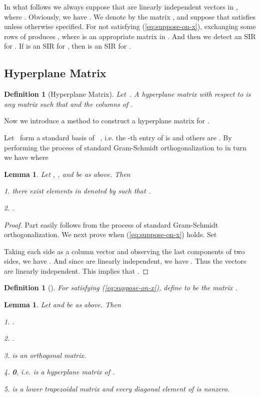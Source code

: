 \documentclass{sig-alternate}
\newtheorem{lem}[theorem]{Lemma}
\newtheorem{defn}[theorem]{Definition}
\numberwithin{theorem}{section} \numberwithin{equation}{section}
\begin{document}
In what follows we always suppose that  are linearly independent vectors in ,
where . Obviously, we
have . We denote by  the matrix , and suppose that 
satisfies
 unless otherwise specified. For  not satisfying (\ref{eq:suppose-on-x}),
exchanging some rows of  produces , where  is an
appropriate matrix in . And then we detect an SIR
for . If  is an SIR for , then 
is an SIR for .
\subsection{Hyperplane Matrix}\label{subsec:Hyperplane-matrix}

\begin{defn}[Hyperplane Matrix]\label{def:Hyperplane-matrix}
Let~. A hyperplane matrix  with respect to  is any matrix 
 such that  and the columns of  
.
\end{defn}

Now we introduce a method to construct a hyperplane matrix for  .

Let ~form a standard basis of
~, i.e. the -th entry of  is 
and others are . By performing the process of standard
Gram-Schmidt orthogonalization to  in turn we have
where


\begin{lem}\label{lem:hyperplane-matrix-construction}
Let , ,  and
 be as above. Then


1. there exist  elements in  denoted by  such that
 .


2. .
\end{lem}

\begin{proof}
Part  easily follows from the process of standard Gram-Schmidt
orthogonalization. We next prove  when  (\ref{eq:suppose-on-x}) holds.
Set

Taking each side as a column vector and observing the last 
components of two sides, we have . And since
 are linearly independent,
we have . Thus the  vectors
 are linearly independent. This implies that
.
\end{proof}





\begin{defn}[]
\label{def:H_X} For  satisfying
(\ref{eq:suppose-on-x}), define  to be the  matrix .
\end{defn}

\begin{lem}\label{lem:property-of-Hx}
Let  and  be as above. Then


1. .


2. .


3.  is an
orthogonal matrix.

4. \textbf{0}, i.e.  is a hyperplane matrix of
.





5.  is a lower trapezoidal matrix and every diagonal element
of  is nonzero.
\end{lem}
\end{document}
